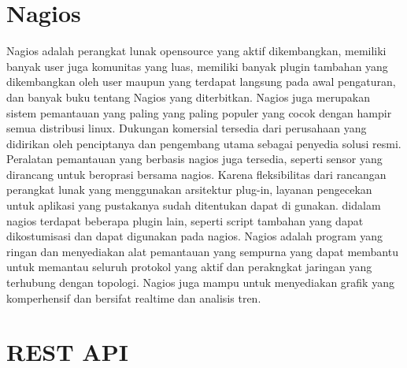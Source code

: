 		\section{Nagios}
			Nagios adalah perangkat lunak opensource yang aktif dikembangkan, memiliki banyak user juga komunitas yang luas, memiliki banyak plugin tambahan yang dikembangkan oleh user maupun yang terdapat langsung pada awal pengaturan, dan banyak buku tentang Nagios yang diterbitkan. Nagios juga merupakan sistem pemantauan yang paling yang paling populer yang cocok dengan hampir semua distribusi linux. Dukungan komersial tersedia dari perusahaan yang didirikan oleh penciptanya dan pengembang utama sebagai penyedia solusi resmi. Peralatan pemantauan yang berbasis nagios juga tersedia, seperti sensor yang dirancang untuk beroprasi bersama nagios. Karena fleksibilitas dari rancangan perangkat lunak yang menggunakan arsitektur plug-in, layanan pengecekan untuk aplikasi yang pustakanya sudah ditentukan dapat di gunakan. didalam nagios terdapat beberapa plugin lain, seperti script tambahan yang dapat dikostumisasi dan dapat digunakan pada nagios. Nagios adalah program yang ringan dan menyediakan alat pemantauan yang sempurna yang dapat membantu untuk memantau seluruh protokol yang aktif dan perakngkat jaringan yang terhubung dengan topologi. Nagios juga mampu untuk menyediakan grafik yang komperhensif dan bersifat realtime dan analisis tren.
			
		\section{REST API}
			